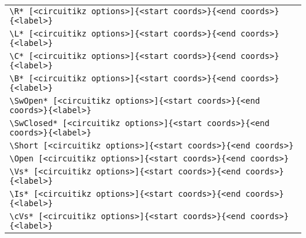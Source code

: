 \documentclass[a4paper,12pt]{article}
\begin{document}
\begin{center}
    \footnotesize
    \begin{tabular}{l}
        \hline
        \hline
        \texttt{\textbackslash R* [\textless circuitikz options\textgreater]\{\textless start coords\textgreater\}\{\textless end coords\textgreater\}\{\textless label\textgreater\}} \\
        \texttt{\textbackslash L* [\textless circuitikz options\textgreater]\{\textless start coords\textgreater\}\{\textless end coords\textgreater\}\{\textless label\textgreater\}} \\
        \texttt{\textbackslash C* [\textless circuitikz options\textgreater]\{\textless start coords\textgreater\}\{\textless end coords\textgreater\}\{\textless label\textgreater\}} \\
        \texttt{\textbackslash B* [\textless circuitikz options\textgreater]\{\textless start coords\textgreater\}\{\textless end coords\textgreater\}\{\textless label\textgreater\}} \\
        \hline
        \texttt{\textbackslash SwOpen* [\textless circuitikz options\textgreater]\{\textless start coords\textgreater\}\{\textless end coords\textgreater\}\{\textless label\textgreater\}}  \\
        \texttt{\textbackslash SwClosed* [\textless circuitikz options\textgreater]\{\textless start coords\textgreater\}\{\textless end coords\textgreater\}\{\textless label\textgreater\}} \\
        \hline
        \texttt{\textbackslash Short [\textless circuitikz options\textgreater]\{\textless start coords\textgreater\}\{\textless end coords\textgreater\}}  \\
        \texttt{\textbackslash Open  [\textless circuitikz options\textgreater]\{\textless start coords\textgreater\}\{\textless end coords\textgreater\}}  \\
        \hline
        \texttt{\textbackslash Vs* [\textless circuitikz options\textgreater]\{\textless start coords\textgreater\}\{\textless end coords\textgreater\}\{\textless label\textgreater\}}  \\
        \texttt{\textbackslash Is* [\textless circuitikz options\textgreater]\{\textless start coords\textgreater\}\{\textless end coords\textgreater\}\{\textless label\textgreater\}} \\
        \texttt{\textbackslash cVs* [\textless circuitikz options\textgreater]\{\textless start coords\textgreater\}\{\textless end coords\textgreater\}\{\textless label\textgreater\}}  \\

\end{tabular}
\end{center}
\end{document}
